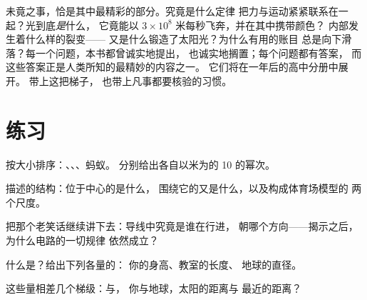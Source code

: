 \begin{remark}[前路所待]\label{rem:g9:atoms-to-galaxies:ahead}
未竟之事，恰是其中最精彩的部分。究竟是什么定律
把力与运动紧紧联系在一起？光到底\emph{是}什么，
它竟能以 $3 \times 10^{8}$ 米每秒飞奔，并在其中携带颜色？
内部发生着什么样的裂变——
又是什么锻造了太阳光？为什么有用的账目
总是向下滑落？每一个问题，本书都曾诚实地提出，
也诚实地搁置；每个问题都有答案，
而这些答案正是人类所知的最精妙的内容之一。
它们将在一年后的高中分册中展开。
带上这把梯子，
也带上凡事都要核验的习惯。
\end{remark}

\section{练习}

\begin{exercise}[$\star$]\label{exo:g9:atoms-to-galaxies:1}
按大小排序：、、、蚂蚁。
分别给出各自以米为的 10 的幂次。
\end{exercise}

\begin{exercise}[$\star$]\label{exo:g9:atoms-to-galaxies:2}
描述的结构：位于中心的是什么，
围绕它的又是什么，以及构成体育场模型的
两个尺度。
\end{exercise}

\begin{exercise}[$\star$]\label{exo:g9:atoms-to-galaxies:3}
把那个老笑话继续讲下去：导线中究竟是谁在行进，
朝哪个方向——揭示之后，为什么电路的一切规律
依然成立？
\end{exercise}

\begin{exercise}[$\star$]\label{exo:g9:atoms-to-galaxies:4}
什么是？给出下列各量的：
你的身高、教室的长度、
地球的直径。
\end{exercise}

\begin{exercise}[$\star$]\label{exo:g9:atoms-to-galaxies:5}
这些量相差几个梯级：与，
你与地球，太阳的距离与
最近的距离？
\end{exercise}

